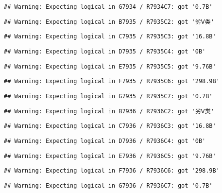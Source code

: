 \documentclass[
]{article}
\begin{document}
\begin{verbatim}
## Warning: Expecting logical in G7934 / R7934C7: got '0.7B'
\end{verbatim}

\begin{verbatim}
## Warning: Expecting logical in B7935 / R7935C2: got '劣Ⅴ类'
\end{verbatim}

\begin{verbatim}
## Warning: Expecting logical in C7935 / R7935C3: got '16.8B'
\end{verbatim}

\begin{verbatim}
## Warning: Expecting logical in D7935 / R7935C4: got '0B'
\end{verbatim}

\begin{verbatim}
## Warning: Expecting logical in E7935 / R7935C5: got '9.76B'
\end{verbatim}

\begin{verbatim}
## Warning: Expecting logical in F7935 / R7935C6: got '298.9B'
\end{verbatim}

\begin{verbatim}
## Warning: Expecting logical in G7935 / R7935C7: got '0.7B'
\end{verbatim}

\begin{verbatim}
## Warning: Expecting logical in B7936 / R7936C2: got '劣Ⅴ类'
\end{verbatim}

\begin{verbatim}
## Warning: Expecting logical in C7936 / R7936C3: got '16.8B'
\end{verbatim}

\begin{verbatim}
## Warning: Expecting logical in D7936 / R7936C4: got '0B'
\end{verbatim}

\begin{verbatim}
## Warning: Expecting logical in E7936 / R7936C5: got '9.76B'
\end{verbatim}

\begin{verbatim}
## Warning: Expecting logical in F7936 / R7936C6: got '298.9B'
\end{verbatim}

\begin{verbatim}
## Warning: Expecting logical in G7936 / R7936C7: got '0.7B'
\end{verbatim}
\end{document}
